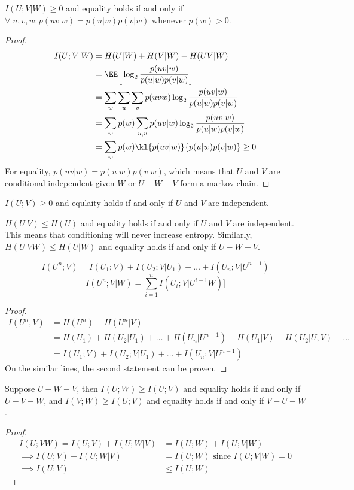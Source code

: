 \begin{theorem}
$I(U;V|W) \geq 0$ and equality holds if and only if $\forall\;u,v,w: p(uv|w) = p(u|w)p(v|w)$ whenever $p(w) > 0$.
\end{theorem}
\begin{proof}
\begin{align*}
    I(U;V|W) &= H(U|W) + H(V|W) - H(UV|W) \\
    &= \EE\bigg[\log_2 \frac{p(uv|w)}{p(u|w)p(v|w)}\bigg] \\
    &= \sum_w \sum_u \sum_v p(uvw) \log_2 \frac{p(uv|w)}{p(u|w)p(v|w)} \\
    &= \sum_w p(w)\sum_{u,v} p(uv|w) \log_2 \frac{p(uv|w)}{p(u|w)p(v|w)} \\
    &= \sum_w p(w) \kl{p(uv|w)}{p(u|w)p(v|w)} \geq 0
\end{align*}
For equality, $p(uv|w) = p(u|w)p(v|w)$, which means that $U$ and $V$ are conditional independent given $W$ or $U-W-V$ form a markov chain.
\end{proof}
\begin{corollary}
$I(U;V) \geq 0$ and equlaity holds if and only if $U$ and $V$ are independent.
\end{corollary}
\begin{corollary}
$H(U|V) \leq H(U)$ and equality holds if and only if $U$ and $V$ are independent. This means that conditioning will never increase entropy. Similarly, $H(U|VW) \leq H(U|W)$ and equality holds if and only if $U-W-V$.
\end{corollary}
\begin{theorem}
\[I(U^n;V) = I(U_1;V) + I(U_2;V|U_1) + \dots + I(U_n;V|U^{n-1}) \]
\[ I(U^n; V|W) = \sum_{i=1}^n I(U_i;V | U^{i-1}W) ]\]
\end{theorem}
\begin{proof}
\begin{align*}
I(U^n,V) &= H(U^n) - H(U^n|V) \\
&= H(U_1) + H(U_2|U_1) + \dots + H(U_n|U^{n-1}) - H(U_1|V) - H(U_2|U,V) - \dots \\
&= I(U_1;V) + I(U_2;V|U_1) + \dots + I(U_n;V|U^{n-1})
\end{align*}
On the similar lines, the second statement can be proven.
\end{proof}
\begin{theorem}
Suppose $U-W-V$, then $I(U;W) \geq I(U;V)$ and equality holds if and only if $U-V-W$, and $I(V;W) \geq I(U;V)$ and equality holds if and only if $V-U-W$.
\end{theorem}
\begin{proof}
\begin{align*}
I(U;VW) = I(U;V) + I(U;W|V) &= I(U;W) + I(U;V|W) \\
\implies I(U;V) + I(U;W|V) &= I(U;W) \text{ since } I(U;V|W) = 0 \\
\implies I(U;V) &\leq I(U;W)
\end{align*}
\end{proof}